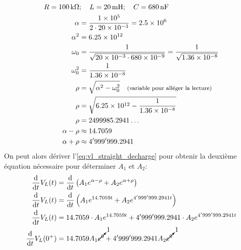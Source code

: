 \documentclass[a11paper, 11pt]{article}
\newcommand{\ddt}[1]{\frac{\text{d}^{#1}}{\text{d}t^{#1}}}
\newcommand{\vlt}{V_L(t)}
\newcommand{\vlz}{V_L(0^+)}
\newcommand{\al}{\alpha}
\newcommand{\wz}{\omega_{0}}
\newcommand{\ws}{\omega_{0}^2}
\renewcommand{\exp}[1]{\times10^{#1}}
\begin{document}
\begin{appendix}
	\begin{gather*}
		\begin{align}
			R    = \SI{100}{\kohm} & ;\quad L  = \SI{20}{\mH};\quad C = \SI{680}{\nF}                               \\
			\al                    & = \frac{1\exp{5}}{2\cdot20\exp{-3}} = 2.5\exp{6}                               \\
			\al^2                  & = 6.25\exp{12}                                                                 \\
			\wz                    & =\frac{1}{\sqrt{20\exp{-3}\cdot680\exp{-9}}} = \frac{1}{\sqrt{1.36\exp{-8}}}   \\
			\ws                    & =\frac{1}{1.36\exp{-8}}                                                        \\
			\rho                   & = \sqrt{\al^2-\ws} \quad\text{\footnotesize(variable pour alléger la lecture)} \\
			\rho                   & = \sqrt{6.25\exp{12}-\frac{1}{1.36\exp{-8}}}                                   \\
			\rho                   & = 2499985.2941\ldots                                                           \\
			\al-\rho               & \approx 14.7059                                                                \\
			\al+\rho               & \approx 4'999'999.2941
		\end{align}
	\end{gather*}
	On peut alors dériver l'\cref{eq:vl_straight_decharge} pour obtenir la deuxième équation
	nécessaire pour déterminer $A_1$ et $A_2$:
	\begin{align}
		\ddt{}\vlt & =\ddt{}\left( A_1e^{\al-\rho} + A_2e^{\al+\rho}\right)                      \\
		\ddt{}\vlt & =\ddt{}\left( A_1e^{14.7059t} + A_2e^{4'999'999.2941t}\right)               \\
		\ddt{}\vlt & = 14.7059\cdot A_1e^{14.7059t} + 4'999'999.2941\cdot A_2e^{4'999'999.2941t}
		\label{eq:vlt-decharge-deriv}                                                            \\
		\ddt{}\vlz & = 14.7059 A_1\cancelto{1}{e^{0}} + 4'999'999.2941 A_2\cancelto{1}{e^{0}}
		\label{eq:bertha_mommy_decharge}
	\end{align}


\end{appendix}
\end{document}
